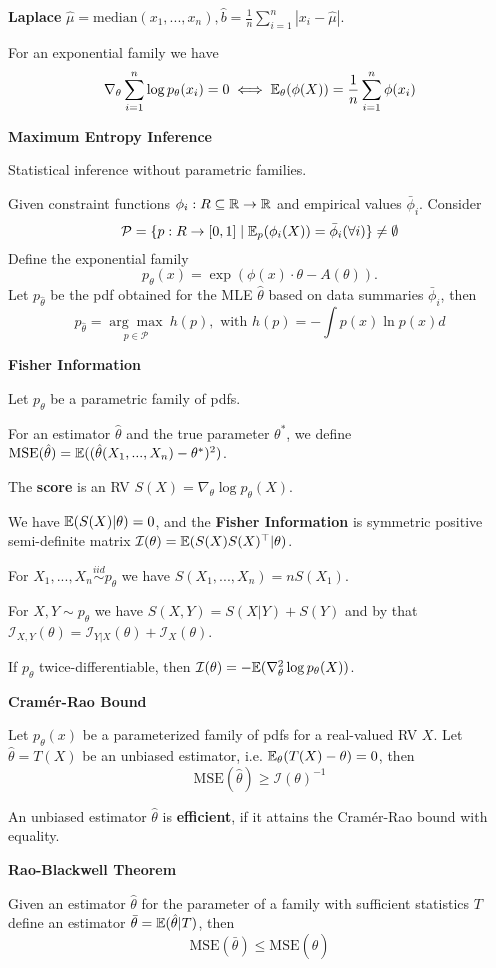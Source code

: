 \textbf{Laplace} \(\hat{\mu} = \text{median}(x_1, ...,x_n), \hat{b} = \frac{1}{n}\sum_{i=1}^n|x_i-\hat{\mu}|\).

For an exponential family we have
\[\nabla_\theta \sum_{i = 1}^n \log p_\theta(x_i) = 0 \iff \mathbb{E}_\theta(\phi(X)) = \frac{1}{n}\sum_{i = 1}^n\phi(x_i)\]

\textbf{Maximum Entropy Inference}

Statistical inference without parametric families.

Given constraint functions \(\phi_i: R \subseteq \mathbb{R} \to \mathbb{R}\) and empirical values \(\bar{\phi}_i\). Consider
\[\mathcal{P} = \{p: R \to [0, 1] \mid \mathbb{E}_p(\phi_i(X)) = \bar{\phi}_i (\forall i) \}\neq \emptyset\]
Define the exponential family
\[p_{\theta}(x) = \exp(\phi(x)\cdot \theta - A(\theta)).\]
Let \(p_{\hat{\theta}}\) be the pdf obtained for the MLE \(\hat{\theta}\) based on data summaries 
\(\bar{\phi}_i\), then
\[p_{\hat{\theta}} = \underset{p \in \mathcal{P}}{\arg \max} \ h(p), \text{ with } h(p) = - \int p(x) \ln p(x) d\]

\textbf{Fisher Information}

Let \(p_\theta\) be a parametric family of pdfs. 

For an estimator \(\hat{\theta}\) and the true parameter \(\theta^*\), we define 
\(\text{MSE}(\hat{\theta}) = \mathbb{E}((\hat{\theta}(X_1, ..., X_n) - \theta^*)^2)\).

The \textbf{score} is an RV \(S(X) = \nabla_\theta \log p_\theta(X)\).

We have \(\mathbb{E}(S(X)|\theta) = 0\), and the \textbf{Fisher Information} is 
symmetric positive semi-definite matrix \(\mathcal{I}(\theta) = \mathbb{E}(S(X)S(X)^\top | \theta)\).

For \(X_1, ..., X_n \overset{iid}{\sim} p_{\theta}\) we have \(S(X_1, ...,X_n) = n S(X_1)\).

For \(X, Y \sim p_{\theta}\) we have \(S(X, Y) = S(X|Y)+S(Y)\) and by that 
\(\mathcal{I}_{X, Y}(\theta) = \mathcal{I}_{Y|X}(\theta) + \mathcal{I}_{X}(\theta)\).

If \(p_\theta\) twice-differentiable, then \(\mathcal{I}(\theta) = -\mathbb{E}(\nabla_\theta^2 \log p_\theta(X))\).

\textbf{Cramér-Rao Bound}

Let \(p_\theta(x)\) be a parameterized family of pdfs for a real-valued RV \(X\). 
Let \(\hat{\theta} = T(X)\) be an unbiased estimator, i.e. \(\mathbb{E}_\theta(T(X)- \theta) = 0\), then 
\[\text{MSE}(\hat{\theta}) \geq \mathcal{I}(\theta)^{-1}\]

An unbiased estimator \(\hat{\theta}\) is \textbf{efficient}, if it attains the Cramér-Rao bound with equality.

\textbf{Rao-Blackwell Theorem}

Given an estimator \(\hat{\theta}\) for the parameter of a family with sufficient statistics \(T\) define an estimator
\(\bar{\theta} = \mathbb{E}(\hat{\theta} | T)\), then 
\[\text{MSE}(\bar{\theta}) \leq \text{MSE}(\hat{\theta})\]